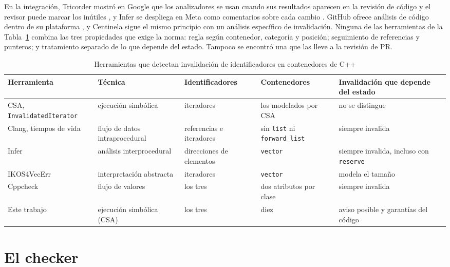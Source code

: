 \documentclass[conference]{IEEEtran}
\newcommand{\code}[1]{\texttt{#1}}
\begin{document}
En la integración, Tricorder mostró en Google que los analizadores se usan cuando sus resultados aparecen en la revisión de código y el revisor puede marcar los inútiles \cite{sadowski15}, y Infer se despliega en Meta como comentarios sobre cada cambio \cite{distefano19}. GitHub ofrece análisis de código dentro de su plataforma \cite{ghcodesec}, y Centinela sigue el mismo principio con un análisis específico de invalidación. Ninguna de las herramientas de la Tabla~\ref{tab:comparacion} combina las tres propiedades que exige la norma: regla según contenedor, categoría y posición; seguimiento de referencias y punteros; y tratamiento separado de lo que depende del estado. Tampoco se encontró una que las lleve a la revisión de PR.

\begin{table}[!t]
\caption{Herramientas que detectan invalidación de identificadores en contenedores de C++}
\label{tab:comparacion}
\centering
\footnotesize
\setlength{\tabcolsep}{4pt}\begin{tabular}{@{}>{\raggedright\arraybackslash}p{3.4cm} >{\raggedright\arraybackslash}p{3.0cm} >{\raggedright\arraybackslash}p{2.6cm} >{\raggedright\arraybackslash}p{2.7cm} >{\raggedright\arraybackslash}p{4.6cm}@{}}
\hline
\textbf{Herramienta} & \textbf{Técnica} & \textbf{Identificadores} & \textbf{Contenedores} & \textbf{Invalidación que depende del estado}\\
\hline
CSA, \code{InvalidatedIterator} \cite{csadoc} & ejecución simbólica & iteradores & los modelados por CSA & no se distingue\\
Clang, tiempos de vida \cite{saxena26} & flujo de datos intraprocedural & referencias e iteradores & sin \code{list} ni \code{forward\_list} & siempre invalida\\
Infer \cite{infer} & análisis interprocedural & direcciones de elementos & \code{vector} & siempre invalida, incluso con \code{reserve}\\
IKOS4VecErr \cite{liu25} & interpretación abstracta & iteradores & \code{vector} & modela el tamaño\\
Cppcheck \cite{cppcheck} & flujo de valores & los tres & dos atributos por clase & siempre invalida\\
Este trabajo & ejecución simbólica (CSA) & los tres & diez & aviso posible y garantías del código\\
\hline
\end{tabular}
\end{table}

\section{El checker}
\end{document}
